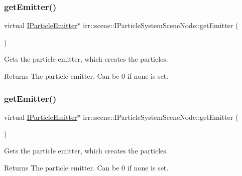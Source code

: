 \subsubsection{\texorpdfstring{get\+Emitter()}{getEmitter()}\hspace{0.1cm}{\footnotesize\ttfamily [1/2]}}
{\footnotesize\ttfamily virtual \hyperlink{classirr_1_1scene_1_1IParticleEmitter}{I\+Particle\+Emitter}$\ast$ irr\+::scene\+::\+I\+Particle\+System\+Scene\+Node\+::get\+Emitter (\begin{DoxyParamCaption}{ }\end{DoxyParamCaption})\hspace{0.3cm}{\ttfamily [pure virtual]}}



Gets the particle emitter, which creates the particles. 

\begin{DoxyReturn}{Returns}
The particle emitter. Can be 0 if none is set. 
\end{DoxyReturn}
\mbox{\label{classirr_1_1scene_1_1IParticleSystemSceneNode_a2f1a12f030ad5aadfd8d1be24021c7d5}} 
\subsubsection{\texorpdfstring{get\+Emitter()}{getEmitter()}\hspace{0.1cm}{\footnotesize\ttfamily [2/2]}}
{\footnotesize\ttfamily virtual \hyperlink{classirr_1_1scene_1_1IParticleEmitter}{I\+Particle\+Emitter}$\ast$ irr\+::scene\+::\+I\+Particle\+System\+Scene\+Node\+::get\+Emitter (\begin{DoxyParamCaption}{ }\end{DoxyParamCaption})\hspace{0.3cm}{\ttfamily [pure virtual]}}



Gets the particle emitter, which creates the particles. 

\begin{DoxyReturn}{Returns}
The particle emitter. Can be 0 if none is set. 
\end{DoxyReturn}
\mbox{\label{classirr_1_1scene_1_1IParticleSystemSceneNode_aececff4531482ce976f1859c40bf3f76}} 
